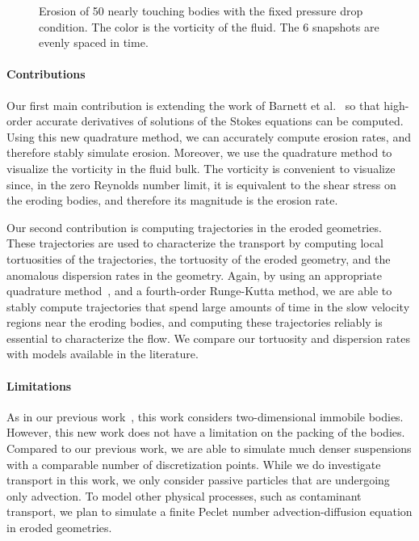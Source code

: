 \documentclass[preprint, 10pt]{elsarticle}
\begin{document}
\begin{figure}[H]
\begin{center}
\caption{\label{fig:Eroding50vort} Erosion of 50 nearly touching
bodies with the fixed pressure drop condition. The color is the
vorticity of the fluid. The 6 snapshots are evenly spaced in time.}
\end{center}
\end{figure}

\paragraph{Contributions}
Our first main contribution is extending the work of Barnett et
al.~\cite{bar-wu-vee2015} so that high-order accurate derivatives of
solutions of the Stokes equations can be computed.  Using this new
quadrature method, we can accurately compute erosion rates, and
therefore stably simulate erosion.  Moreover, we use the quadrature
method to visualize the vorticity in the fluid bulk.  The vorticity is
convenient to visualize since, in the zero Reynolds number limit, it is
equivalent to the shear stress on the eroding bodies, and therefore its
magnitude is the erosion rate.

Our second contribution is computing trajectories in the eroded
geometries.  These trajectories are used to characterize the transport
by computing local tortuosities of the trajectories, the tortuosity of
the eroded geometry, and the anomalous dispersion rates in the geometry.
Again, by using an appropriate quadrature method~\cite{bar-wu-vee2015},
and a fourth-order Runge-Kutta method, we are able to stably compute
trajectories that spend large amounts of time in the slow velocity
regions near the eroding bodies, and computing these trajectories
reliably is essential to characterize the flow.  We compare our
tortuosity and dispersion rates with models available in the literature.

\paragraph{Limitations}
As in our previous work~\cite{qua-moo2018}, this work considers
two-dimensional immobile bodies. However, this new work does not have a
limitation on the packing of the bodies. Compared to our previous work,
we are able to simulate much denser suspensions with a comparable number
of discretization points.  While we do investigate transport in this
work, we only consider passive particles that are undergoing only
advection. To model other physical processes, such as contaminant
transport, we plan to simulate a finite Peclet number
advection-diffusion equation in eroded geometries.
\end{document}
